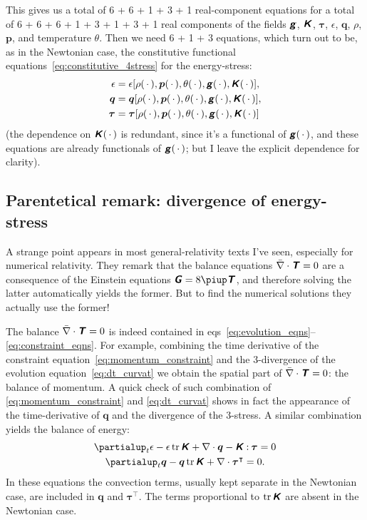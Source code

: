 \documentclass[\ifafour a4paper,12pt,\else a5paper,10pt,\fi%
onecolumn,oneside,article,%
british%
]{memoir}
\theoremstyle{remark}
\theoremstyle{innote}
\newcommand*{\mathte}[1]{\textbf{\textit{\textsf{#1}}}}
\newcommand*{\de}{\partialup}%
\newcommand*{\pu}{\piup}%
\DeclareMathOperator{\tr}{tr}%
\newcommand*{\dotv}{\mathord{\,\cdot\,}}%
\newcommand*{\con}{\mathbin{:}}%
\renewcommand*{\|}{\nonscript\,\vert\nonscript\;\mathopen{}}
\newcommand*{\eqns}{eqs}%
\newcommand*{\T}{^\intercal}%
\newcommand*{\ydd}{\rho}
\newcommand*{\yd}{\ydd}
\newcommand*{\yjj}{p}
\newcommand*{\yj}{\bm{\yjj}}
\newcommand*{\yGG}{G}
\newcommand*{\yG}{\mathte{\yGG}}
\newcommand*{\yTT}{\tau}
\newcommand*{\yT}{\bm{\yTT}}
\newcommand*{\yTTf}{T}
\newcommand*{\yTf}{\mathte{\yTTf}}
\newcommand*{\ygg}{g}
\newcommand*{\yg}{\mathte{\ygg}}
\newcommand*{\yKK}{K}
\newcommand*{\yK}{\mathte{\yKK}}
\newcommand*{\ypp}{q}
\newcommand*{\yp}{\bm{\ypp}}
\newcommand*{\ye}{\epsilon}
\newcommand*{\yte}{\theta}
\newcommand*{\ynab}{\nabla}
\newcommand*{\ynaf}{\Bar{\nabla}}
\begin{document}
This gives us a total of 6 + 6 + 1 + 3 + 1 real-component equations for a
total of 6 + 6 + 6 + 1 + 3 + 1 + 3 + 1 real components of the fields $\yg$,
$\yK$, $\yT$, $\ye$, $\yp$, $\yd$, $\yj$, and temperature $\yte$. Then we
need 6 + 1 + 3 equations, which turn out to be, as in the Newtonian case,
the constitutive functional equations~\eqref{eq:constitutive_4stress} for
the energy-stress:
\begin{subequations}\label{eq:constitutive_4stress_gen-rel}
  \begin{align}
    \label{eq:constit_energy_gen-rel}
    \ye &= \ye[\yd(\dotv),\yj(\dotv),\yte(\dotv),\yg(\dotv), \yK(\dotv)],
    \\
    \label{eq:constit_energy-flux_gen-rel}
    \yp &= \yp[\yd(\dotv),\yj(\dotv),\yte(\dotv),\yg(\dotv), \yK(\dotv)],
    \\
    \label{eq:constit_3stress_gen-rel}
    \yT &= \yT[\yd(\dotv),\yj(\dotv),\yte(\dotv),\yg(\dotv), \yK(\dotv)]
  \end{align}
\end{subequations}
(the dependence on $\yK(\dotv)$ is redundant, since it's a functional of
$\yg(\dotv)$, and these equations are already functionals of $\yg(\dotv)$;
but I leave the explicit dependence for clarity).

\subsection{Parentetical remark: divergence of energy-stress}
\label{sec:divergence_4stress}

A strange point appears in most general-relativity texts I've seen,
especially for numerical relativity. They remark that the balance equations
$\ynaf\cdot\yTf = 0$ are a consequence of the Einstein equations
$\yG = 8\pu \yTf$, and therefore solving the latter automatically yields
the former. But to find the numerical solutions they actually use the
former!

The balance $\ynaf\cdot\yTf = 0$ is indeed contained in
\eqns~\eqref{eq:evolution_eqns}--\eqref{eq:constraint_eqns}. For example,
combining the time derivative of the constraint
equation~\eqref{eq:momentum_constraint} and the 3-divergence of the
evolution equation~\eqref{eq:dt_curvat} we obtain the spatial part of
$\ynaf\cdot\yTf = 0$: the balance of momentum. A quick check of such
combination of \eqref{eq:momentum_constraint} and \eqref{eq:dt_curvat}
shows in fact the appearance of the time-derivative of $\yp$ and the
divergence of the 3-stress. A similar combination yields the balance of
energy:
\begin{subequations}\label{eq:evolution_energy_momentum}
  \begin{gather}
    \label{eq:dt_energy}
    \de_t \ye - \ye\tr\yK + \ynab\cdot\yp - \yK\con\yT =0
    \\
    \label{eq:dt_momentum}
    \de_t \yp -  \yp\tr\yK + \ynab\cdot\yT\T =0.
  \end{gather}
\end{subequations}
In these equations the convection terms, usually kept separate in the
Newtonian case, are included in $\yp$ and $\yT\T$. The terms proportional
to $\tr\yK$ are absent in the Newtonian case.
\end{document}
